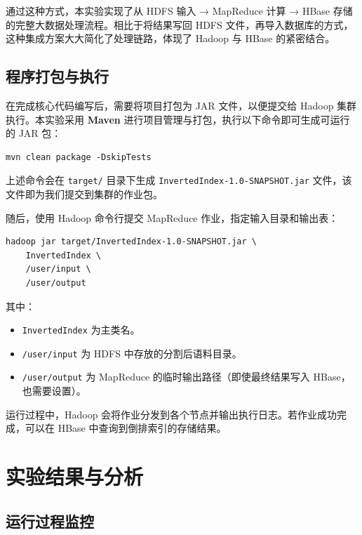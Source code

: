 \documentclass[]{bitreport}
\begin{document}
通过这种方式，本实验实现了从 HDFS 输入 → MapReduce 计算 → HBase 存储的完整大数据处理流程。相比于将结果写回 HDFS 文件，再导入数据库的方式，这种集成方案大大简化了处理链路，体现了 Hadoop 与 HBase 的紧密结合。

\subsection{程序打包与执行}

在完成核心代码编写后，需要将项目打包为 JAR 文件，以便提交给 Hadoop 集群执行。本实验采用 \textbf{Maven} 进行项目管理与打包，执行以下命令即可生成可运行的 JAR 包：

\begin{lstlisting}[style=shell]
mvn clean package -DskipTests
\end{lstlisting}

上述命令会在 \texttt{target/} 目录下生成 \texttt{InvertedIndex-1.0-SNAPSHOT.jar} 文件，该文件即为我们提交到集群的作业包。

随后，使用 Hadoop 命令行提交 MapReduce 作业，指定输入目录和输出表：

\begin{lstlisting}[style=shell]
hadoop jar target/InvertedIndex-1.0-SNAPSHOT.jar \
    InvertedIndex \
    /user/input \
    /user/output
\end{lstlisting}

其中：
\begin{itemize}
  \item \texttt{InvertedIndex} 为主类名。
  \item \texttt{/user/input} 为 HDFS 中存放的分割后语料目录。
  \item \texttt{/user/output} 为 MapReduce 的临时输出路径（即使最终结果写入 HBase，也需要设置）。
\end{itemize}

运行过程中，Hadoop 会将作业分发到各个节点并输出执行日志。若作业成功完成，可以在 HBase 中查询到倒排索引的存储结果。

\section{实验结果与分析}
\subsection{运行过程监控}
\end{document}

